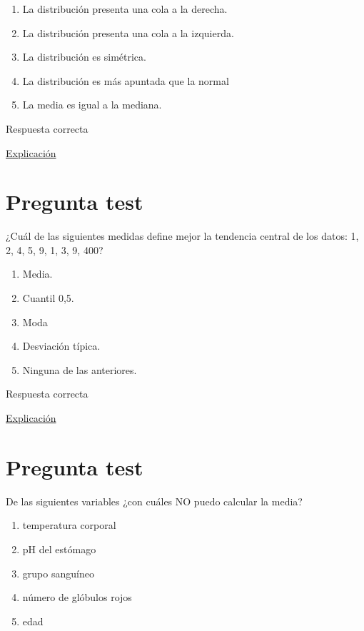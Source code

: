 \documentclass[
]{book}
\providecommand{\tightlist}{%
  \setlength{\itemsep}{0pt}\setlength{\parskip}{0pt}}
\begin{document}
\begin{enumerate}
\def\labelenumi{\alph{enumi})}
\tightlist
\item
  La distribución presenta una cola a la derecha.
\item
  La distribución presenta una cola a la izquierda.
\item
  La distribución es simétrica.
\item
  La distribución es más apuntada que la normal
\item
  La media es igual a la mediana.
\end{enumerate}

Respuesta correcta

\href{https://1fjmanzano.github.io/bioestadistica/medidas-de-forma.html}{Explicación}

\hypertarget{pregunta-test-58}{%
\section{Pregunta test}\label{pregunta-test-58}}

¿Cuál de las siguientes medidas define mejor la tendencia central de los datos: 1, 2, 4, 5, 9, 1, 3, 9, 400?

\begin{enumerate}
\def\labelenumi{\alph{enumi})}
\tightlist
\item
  Media.
\item
  Cuantil 0,5.
\item
  Moda
\item
  Desviación típica.
\item
  Ninguna de las anteriores.
\end{enumerate}

Respuesta correcta

\href{https://1fjmanzano.github.io/bioestadistica/medidas-de-posicio\%CC\%81n-dispersio\%CC\%81n-y-forma.html\#medidas-de-posicio\%CC\%81n-no-centrales}{Explicación}

\hypertarget{pregunta-test-59}{%
\section{Pregunta test}\label{pregunta-test-59}}

De las siguientes variables ¿con cuáles NO puedo calcular la media?

\begin{enumerate}
\def\labelenumi{\alph{enumi})}
\tightlist
\item
  temperatura corporal
\item
  pH del estómago
\item
  grupo sanguíneo
\item
  número de glóbulos rojos
\item
  edad
\end{enumerate}
\end{document}
